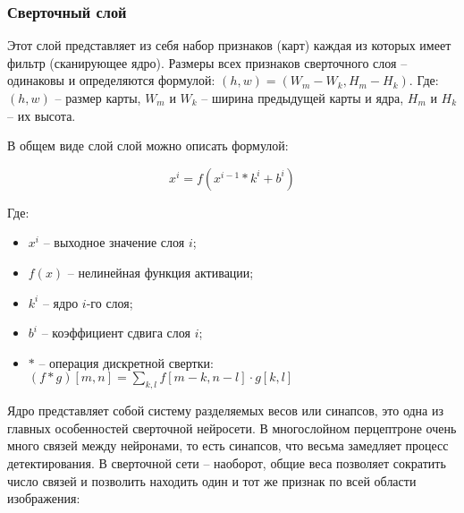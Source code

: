 \subsubsection{Сверточный слой}

Этот слой представляет из себя набор признаков (карт) каждая из которых имеет фильтр (сканирующее ядро)\cite{lib-cnn}. Размеры всех признаков сверточного слоя -- одинаковы и определяются формулой: $(h,w) = (W_m-W_k, H_m-H_k)$. Где: $(h,w)$ -- размер карты, $W_m$ и $W_k$ -- ширина предыдущей карты и ядра, $H_m$ и $H_k$ -- их высота.

В общем виде слой слой можно описать формулой:

$$
x^i = f(x^{i-1}*k^i+b^i)
$$

Где:
\begin{itemize}
    \item $x^i$ -- выходное значение слоя $i$;
    \item $f(x)$ -- нелинейная функция активации;
    \item $k^i$ -- ядро $i$-го слоя;
    \item $b^i$ -- коэффициент сдвига слоя $i$;
    \item $*$ -- операция дискретной свертки: $(f*g)[m,n]=\sum_{k,l} f[m-k,n-l]\cdot g[k,l]$
\end{itemize}


Ядро представляет собой систему разделяемых весов или синапсов, это одна из главных особенностей сверточной нейросети. В многослойном перцептроне \cite{lib-perciptrone} очень много связей между нейронами, то есть синапсов, что весьма замедляет процесс детектирования. В сверточной сети -- наоборот, общие веса позволяет сократить число связей и позволить находить один и тот же признак по всей области изображения:

